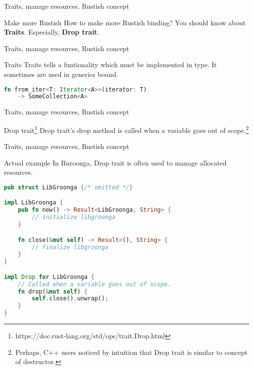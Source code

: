 \documentclass[12pt, unicode]{beamer}
\begin{document}
\begin{frame}{Traits, manage resources, Rustish concept}
\begin{block}{Make more Rustish}
  How to make more Rustish binding?
  \newline
  You should know about \textbf {Traits}. Especially, \textbf {Drop trait}.
\end{block}
\end{frame}

\begin{frame}[fragile]{Traits, manage resources, Rustish concept}
\begin{block}{Traits}
  Traits tells a funtionality which must be implemented in type.
  \newline
  It sometimes are used in generics bound.
\end{block}
\begin{lstlisting}[language={Rust},basicstyle=\ttfamily\Small]
  fn from_iter<T: Iterator<A>>(iterator: T)
    -> SomeCollection<A>
\end{lstlisting}
\end{frame}

\begin{frame}[fragile]{Traits, manage resources, Rustish concept}
\begin{block}{Drop trait\footnote[frame]{https://doc.rust-lang.org/std/ops/trait.Drop.html}}
  Drop trait's drop method is called when a variable goes out of scope.\footnote[frame]{Perhaps, C++ users noticed by intuition that Drop trait is similar to concept of destructor.}
\end{block}

\end{frame}

\begin{frame}[fragile]{Traits, manage resources, Rustish concept}
\begin{block}{Actual example}
In Ruroonga, Drop trait is often used to manage allocated resources.
\end{block}
\begin{lstlisting}[language={Rust},basicstyle=\ttfamily\Small]
pub struct LibGroonga {/* omitted */}

impl LibGroonga {
    pub fn new() -> Result<LibGroonga, String> {
        // initialize libgroonga
    }

    fn close(&mut self) -> Result<(), String> {
        // finalize libgroonga
    }
}

impl Drop for LibGroonga {
    // Called when a variable goes out of scope.
    fn drop(&mut self) {
        self.close().unwrap();
    }
}
\end{lstlisting}
\end{frame}
\end{document}
